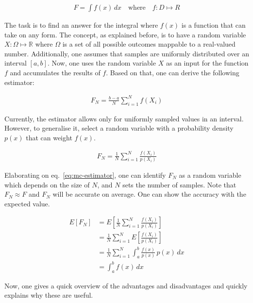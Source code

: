 \begin{align*}
F=\int f(x)\,dx\quad\text{where}\quad f:D \mapsto R
\end{align*}

The task is to find an answer for the integral where $f(x)$ is a function that can take on any form.
The concept, as explained before, is to have a random variable $X:\Omega\mapsto\mathbb{R}$ where $\Omega$ is a set of all possible outcomes mappable to a real-valued number.
Additionally, one assumes that samples are uniformly distributed over an interval $[a,b]$.
Now, one uses the random variable $X$ as an input for the function $f$ and accumulates the results of $f$.
Based on that, one can derive the following estimator:

\begin{align*}
F_N=\frac{b-a}{N}\sum_{i=1}^{N}f(X_i)
\end{align*}

Currently, the estimator allows only for uniformly sampled values in an interval.
However, to generalise it, select a random variable with a probability density $p(x)$ that can weight $f(x)$.

\begin{align}
F_N=\frac{1}{N}\sum_{i=1}^{N}\frac{f(X_i)}{p(X_i)} \label{eq:mc-estimator}
\end{align}

Elaborating on eq.~\ref{eq:mc-estimator}, one can identify $F_N$ as a random variable which depends on the size of $N$, and $N$ sets the number of samples.
Note that $F_N \approx F$ and $F_N$ will be accurate on average.
One can show the accuracy with the expected value.

\begin{align*} 
E[F_N] &=E\left[\frac{1}{N}\sum_{i=1}^{N}\frac{f(X_i)}{p(X_i)}\right]\\
&=\frac{1}{N}\sum_{i=1}^{N}E\left[\frac{f(X_i)}{p(X_i)}\right]\\
&=\frac{1}{N}\sum_{i=1}^{N}\int_{a}^{b}\frac{f(x)}{p(x)}\,p(x)\,dx\\ &=\int_{a}^{b}f(x)\,dx 
\end{align*}

Now, one gives a quick overview of the advantages and disadvantages and quickly explains why these are useful.

